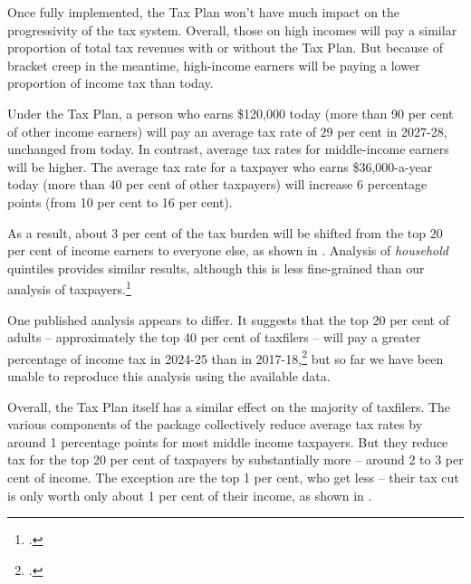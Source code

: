 \documentclass[submission]{grattan}\usepackage[]{graphicx}\usepackage[]{color}
\begin{document}
Once fully implemented, the Tax Plan won't have much impact on the progressivity of the tax system. Overall, those on high incomes will pay a similar proportion of total tax revenues with or without the Tax Plan. But because of bracket creep in the meantime, high-income earners will be paying a lower proportion of income tax than today.


Under the Tax Plan, a person who earns \$120,000 today (more than 90 per cent of other income earners) will pay an average tax rate of 29 per cent in 2027-28, unchanged from today. In contrast, average tax rates for middle-income earners will be higher. The average tax rate for a taxpayer who earns \$36,000-a-year today (more than 40 per cent of other taxpayers) will increase 6 percentage points (from 10 per cent to 16 per cent).

As a result, about 3 per cent of the tax burden will be shifted from the top 20 per cent of income earners to everyone else, as shown in . Analysis of \emph{household} quintiles provides similar results, although this is less fine-grained than our analysis of taxpayers.\footcite{Phillips2018}

One published analysis appears to differ. It suggests that the top 20 per cent of adults -- approximately the top 40 per cent of taxfilers -- will pay a greater percentage of income tax in 2024-25 than in 2017-18,\footcite{Greber} but so far we have been unable to reproduce this analysis using the available data.

Overall, the Tax Plan itself has a similar effect on the majority of taxfilers. The various components of the package collectively reduce average tax rates by around 1 percentage points for most middle income taxpayers. But they reduce tax for the top 20 per cent of taxpayers by substantially more -- around 2 to 3 per cent of income. The exception are the top 1 per cent, who get less -- their tax cut is only worth only about 1 per cent of their income, as shown in .
\end{document}
